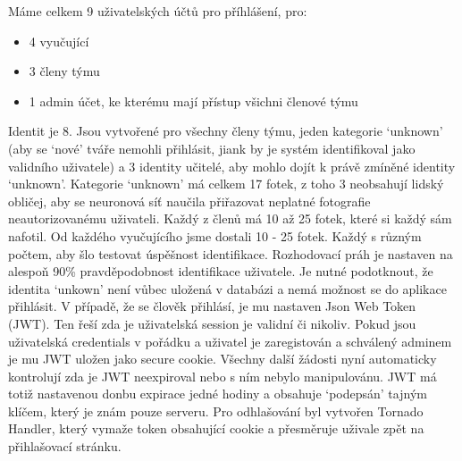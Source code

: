 Máme celkem 9 uživatelských účtů pro příhlášení, pro: 
\begin{itemize}
    \item 4 vyučující%
    \item 3 členy týmu
    \item 1 admin účet, ke kterému mají přístup všichni členové týmu
\end{itemize}
Identit je 8. Jsou vytvořené pro všechny členy týmu, jeden kategorie `unknown' (aby se `nové' tváře nemohli přihlásit, jiank by je systém identifikoval jako validního uživatele) a 3 identity učitelé, aby mohlo dojít k právě zmíněné identity `unknown'.
Kategorie `unknown' má celkem 17 fotek, z toho 3 neobsahují lidský obličej, aby se neuronová síť naučila přiřazovat neplatné fotografie neautorizovanému uživateli.
Každý z členů má 10 až 25 fotek, které si každý sám nafotil.
Od každého vyučujícího jsme dostali 10 - 25 fotek. Každý s různým počtem, aby šlo testovat úspěšnost identifikace.
Rozhodovací práh je nastaven na alespoň 90\% pravděpodobnost identifikace uživatele. 
Je nutné podotknout, že identita `unkown' není vůbec uložená v databázi a nemá možnost se do aplikace přihlásit.
V případě, že se člověk přihlásí, je mu nastaven Json Web Token (JWT). Ten řeší zda je uživatelská session je validní či nikoliv.
Pokud jsou uživatelská credentials v pořádku a uživatel je zaregistován a schválený adminem je mu JWT uložen jako secure cookie.
Všechny další žádosti nyní automaticky kontrolují zda je JWT neexpiroval nebo s ním nebylo manipulovánu. 
JWT má totiž nastavenou donbu expirace jedné hodiny a obsahuje `podepsán' tajným klíčem, který je znám pouze serveru.  
Pro odhlašování byl vytvořen Tornado Handler, který vymaže token obsahující cookie a přesměruje uživale zpět na přihlašovací stránku.